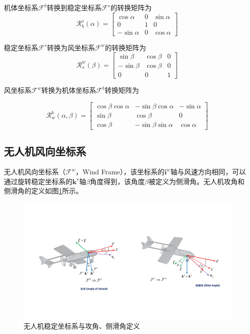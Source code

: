 机体坐标系$\mathcal{F}^b$转换到稳定坐标系$\mathcal{F}^s$的转换矩阵为
\begin{equation} 
\mathcal{R}_b^s(\alpha) = \begin{bmatrix}
\cos \alpha                             & 0                               & \sin \alpha         \\
0 & 1   &0 \\
-\sin \alpha   & 0 & \cos \alpha
\end{bmatrix}
\end{equation}

稳定坐标系$\mathcal{F}^s$转换为风坐标系$\mathcal{F}^w$的转换矩阵为
\begin{equation} 
\mathcal{R}_s^w(\beta) = \begin{bmatrix} \sin \beta  & \cos \beta  &  0      \\  - \sin \beta & \cos \beta   &0 \\  0   & 0 &1  \end{bmatrix}
\end{equation}

风坐标系$\mathcal{F}^w$转换为机体坐标系$\mathcal{F}^b$转换矩阵为

\begin{equation} 
\mathcal{R}_w^b (\alpha,\beta) = \begin{bmatrix} \cos \beta \cos \alpha & - \sin \beta \cos \alpha  & - \sin \alpha      \\	 \sin \beta & \cos \beta   & 0 \\	\cos \beta   & -\sin \beta \sin \alpha & \cos \alpha \end{bmatrix}
\end{equation}

\subsection{无人机风向坐标系}
无人机风向坐标系（$\mathcal{F}^w$，Wind Frame），该坐标系的$\mathbf{i}^w$轴与风速方向相同，可以通过旋转稳定坐标系的$\mathbf{k}^s$轴$\beta$角度得到，该角度$\beta$被定义为侧滑角。无人机攻角和侧滑角的定义如图\ref{fig:chp02_03_uav_aoa_bank}所示。
\begin{figure}[htb]   
	\centering
	\includegraphics[width=\textwidth]{figs/chp02/chp02_03_uav_aoa_bank.pdf}
	\caption{无人机稳定坐标系与攻角、侧滑角定义}
	\label{fig:chp02_03_uav_aoa_bank}
\end{figure}

